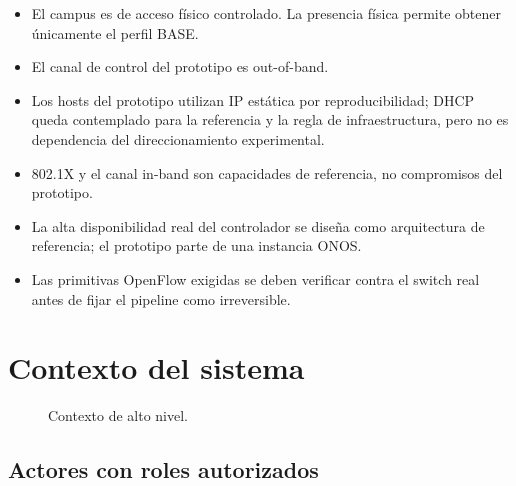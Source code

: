\documentclass[11pt,a4paper]{article}
\begin{document}
\begin{itemize}
\item El campus es de acceso físico controlado. La presencia física permite obtener únicamente el perfil BASE.
\item El canal de control del prototipo es out-of-band.
\item Los hosts del prototipo utilizan IP estática por reproducibilidad; DHCP queda contemplado para la referencia y la regla de infraestructura, pero no es dependencia del direccionamiento experimental.
\item 802.1X y el canal in-band son capacidades de referencia, no compromisos del prototipo.
\item La alta disponibilidad real del controlador se diseña como arquitectura de referencia; el prototipo parte de una instancia ONOS.
\item Las primitivas OpenFlow exigidas se deben verificar contra el switch real antes de fijar el pipeline como irreversible.
\end{itemize}

\section{Contexto del sistema}

\begin{figure}[H]
\centering
{}
\caption{Contexto de alto nivel.}
\end{figure}

\subsection{Actores con roles autorizados}
\end{document}
